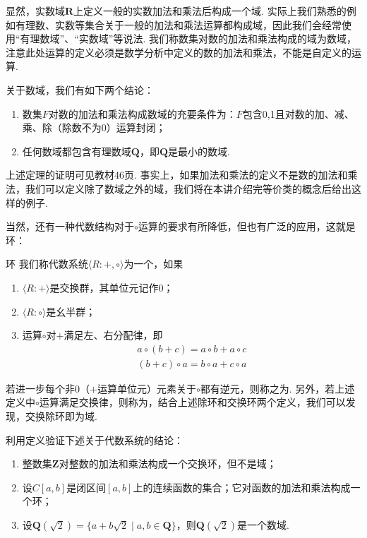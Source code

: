 显然，实数域$\mathbf{R}$上定义一般的实数加法和乘法后构成一个域. 实际上我们熟悉的例如有理数、实数等集合关于一般的加法和乘法运算都构成域，因此我们会经常使用``有理数域''、``实数域''等说法. 我们称数集对数的加法和乘法构成的域为数域，注意此处运算的定义必须是数学分析中定义的数的加法和乘法，不能是自定义的运算.
\begin{theorem}{}{}
    关于数域，我们有如下两个结论：
    \begin{enumerate}
        \item 数集$F$对数的加法和乘法构成数域的充要条件为：$F$包含0,1且对数的加、减、乘、除（除数不为0）运算封闭；

        \item 任何数域都包含有理数域$\mathbf{Q}$，即$\mathbf{Q}$是最小的数域.
    \end{enumerate}
\end{theorem}

上述定理的证明可见教材46页. 事实上，如果加法和乘法的定义不是数的加法和乘法，我们可以定义除了数域之外的域，我们将在本讲介绍完等价类的概念后给出这样的例子.

当然，还有一种代数结构对于$\circ$运算的要求有所降低，但也有广泛的应用，这就是环：
\begin{definition}{环}{} 
    我们称代数系统$\langle R\colon+,\circ\rangle$为一个，如果
    \begin{enumerate}
        \item $\langle R\colon+\rangle$是交换群，其单位元记作0；

        \item $\langle R\colon\circ\rangle$是幺半群；

        \item 运算$\circ$对$+$满足左、右分配律，即
              \begin{gather*}
                  a\circ(b+c)=a\circ b+a\circ c \\
                  (b+c)\circ a=b\circ a+c\circ a
              \end{gather*}
    \end{enumerate}

    若进一步每个非$0$（$+$运算单位元）元素关于$\circ$都有逆元，则称之为. 另外，若上述定义中$\circ$运算满足交换律，则称为，结合上述除环和交换环两个定义，我们可以发现，交换除环即为域.
\end{definition}

\begin{example}{}{}
    利用定义验证下述关于代数系统的结论：
    \begin{enumerate}
        \item 整数集$\mathbf{Z}$对整数的加法和乘法构成一个交换环，但不是域；

        \item 设$C[a,b]$是闭区间$[a,b]$上的连续函数的集合；它对函数的加法和乘法构成一个环；

        \item 设$\mathbf{Q}(\sqrt{2})=\{a+b\sqrt{2} \mid a,b\in\mathbf{Q}\}$，则$\mathbf{Q}(\sqrt{2})$是一个数域.
    \end{enumerate}
\end{example}

